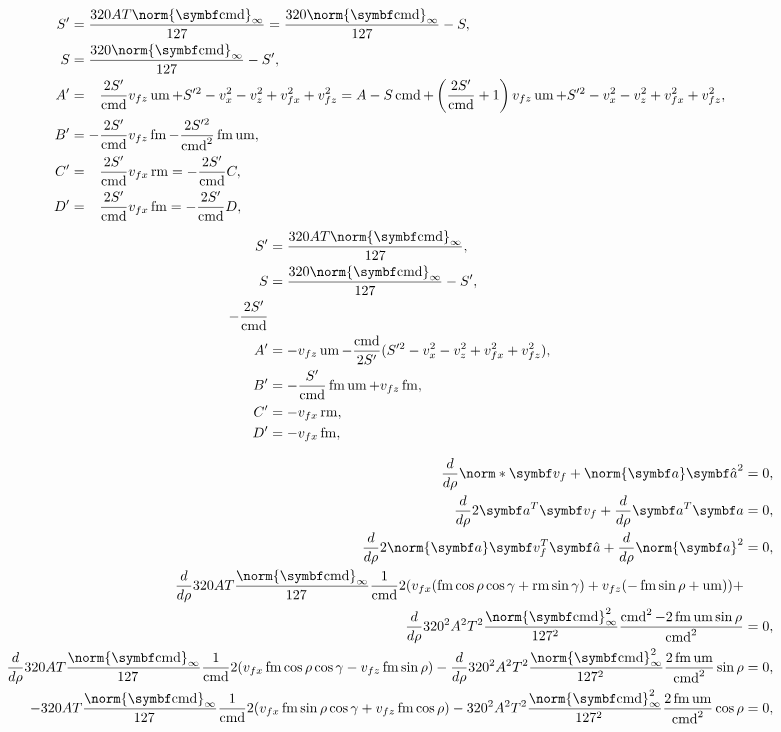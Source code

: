 \begin{align*}
S' &= \frac{320AT\norm{\vec{\cmd}}_{\infty}}{127} = \frac{320\norm{\vec{\cmd}}_{\infty}}{127} - S,\\
S &= \frac{320\norm{\vec{\cmd}}_{\infty}}{127} - S',\\
A' &= \hphantom{-}\frac{2S'}{\cmd}v_{fz}\umove + S'^2 - v_x^2 - v_z^2 + v_{fx}^2 + v_{fz}^2 = A - S\cmd + \left(\frac{2S'}{\cmd} + 1\right)v_{fz}\umove + S'^2 - v_x^2 - v_z^2 + v_{fx}^2 + v_{fz}^2,\\
B' &= -\frac{2S'}{\cmd}v_{fz}\fmove - \frac{2S'^2}{\cmd^2}\fmove\umove,\\
C' &= \hphantom{-}\frac{2S'}{\cmd}v_{fx}\rmove = -\frac{2S'}{\cmd}C,\\
D' &= \hphantom{-}\frac{2S'}{\cmd}v_{fx}\fmove = -\frac{2S'}{\cmd}D,
\end{align*}
\begin{align*}
S' &= \frac{320AT\norm{\vec{\cmd}}_{\infty}}{127},\\
S &= \frac{320\norm{\vec{\cmd}}_{\infty}}{127} - S',\\
-\frac{2S'}{\cmd}\\
A' &= -v_{fz}\umove - \frac{\cmd}{2S'}(S'^2 - v_x^2 - v_z^2 + v_{fx}^2 + v_{fz}^2),\\
B' &= -\frac{S'}{\cmd}\fmove\umove + v_{fz}\fmove,\\
C' &= -v_{fx}\rmove,\\
D' &= -v_{fx}\fmove,
\end{align*}

\begin{align*}
\frac{d}{d\rho}\norm*{\vec{v}_f + \norm{\vec{a}}\uvec{a}}^2 &= 0,\\
\frac{d}{d\rho}2\vec{a}^T \vec{v}_f + \frac{d}{d\rho}\vec{a}^T \vec{a} &= 0,\\
\frac{d}{d\rho}2\norm{\vec{a}} \vec{v}_f^T \uvec{a} + \frac{d}{d\rho}\norm{\vec{a}}^2 &= 0,\\
\frac{d}{d\rho}320AT\frac{\norm{\vec{\cmd}}_{\infty}}{127\hphantom{_{\infty}}} \frac{1}{\cmd}2 (v_{fx}(\fmove \cos\rho\cos\gamma + \rmove \sin\gamma) + v_{fz}(-\fmove \sin\rho + \umove) ) +\\
\frac{d}{d\rho}320^2 A^2 T^2\frac{\norm{\vec{\cmd}}^2_{\infty}}{127^2\hphantom{_{\infty}}} \frac{\cmd^2  - 2\fmove\umove\sin\rho}{\cmd^2} &= 0,\\
%
\frac{d}{d\rho}320AT\frac{\norm{\vec{\cmd}}_{\infty}}{127\hphantom{_{\infty}}} \frac{1}{\cmd}2 (v_{fx}\fmove \cos\rho\cos\gamma - v_{fz}\fmove \sin\rho ) - \frac{d}{d\rho}320^2 A^2 T^2\frac{\norm{\vec{\cmd}}^2_{\infty}}{127^2\hphantom{_{\infty}}} \frac{2\fmove\umove}{\cmd^2}\sin\rho &= 0,\\
-320AT\frac{\norm{\vec{\cmd}}_{\infty}}{127\hphantom{_{\infty}}} \frac{1}{\cmd}2 (v_{fx}\fmove \sin\rho\cos\gamma + v_{fz}\fmove \cos\rho ) - 320^2 A^2 T^2\frac{\norm{\vec{\cmd}}^2_{\infty}}{127^2\hphantom{_{\infty}}} \frac{2\fmove\umove}{\cmd^2}\cos\rho &= 0,
\end{align*}

